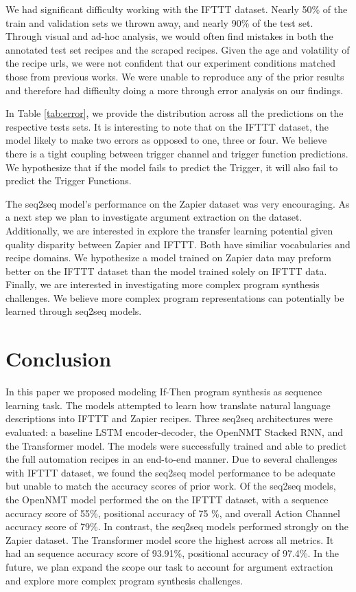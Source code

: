 \documentclass[letterpaper]{article} %
\begin{document}
We had significant difficulty working with the IFTTT dataset. Nearly 50\% of the train and validation sets we thrown away, and nearly 90\% of the test set. Through visual and ad-hoc analysis, we would often find mistakes in both the annotated test set recipes and the scraped recipes. Given the age and volatility of the recipe urls, we were not confident that our experiment conditions matched those from previous works. We were unable to reproduce any of the prior results and therefore had difficulty doing a more through error analysis on our findings.

In Table \ref{tab:error}, we provide the distribution across all the predictions on the respective tests sets. It is interesting to note that on the IFTTT dataset, the model likely to make two errors as opposed to one, three or four. We believe there is a tight coupling between trigger channel and trigger function predictions. We hypothesize that if the model fails to predict the Trigger, it will also fail to predict the Trigger Functions.

The seq2seq model's performance on the Zapier dataset was very encouraging. As a next step we plan to investigate argument extraction on the dataset. Additionally, we are interested in explore the transfer learning potential given quality disparity between Zapier and IFTTT. Both have similiar vocabularies and recipe domains. We hypothesize a model trained on Zapier data may preform better on the IFTTT dataset than the model trained solely on IFTTT data. Finally, we are interested in investigating more complex program synthesis challenges. We believe more complex program representations can potentially be learned through seq2seq models. 


\section{Conclusion}
In this paper we proposed modeling If-Then program synthesis as sequence learning task. The models attempted to learn how translate natural language descriptions into IFTTT and Zapier recipes. Three seq2seq architectures were evaluated: a baseline LSTM encoder-decoder, the OpenNMT Stacked RNN, and the Transformer model. The models were successfully trained and able to predict the full automation recipes in an end-to-end manner. Due to several challenges with IFTTT dataset, we found the seq2seq model performance to be adequate but unable to match the accuracy scores of prior work. Of the seq2seq models, the OpenNMT model performed the on the IFTTT dataset, with a sequence accuracy score of 55\%, positional accuracy of 75 \%, and overall Action Channel accuracy score of 79\%. In contrast, the seq2seq models performed strongly on the Zapier dataset. The Transformer model score the highest across all metrics. It had an sequence accuracy score of 93.91\%, positional accuracy of 97.4\%. In the future, we plan expand the scope our task to account for argument extraction and explore more complex program synthesis challenges.



\end{document}
